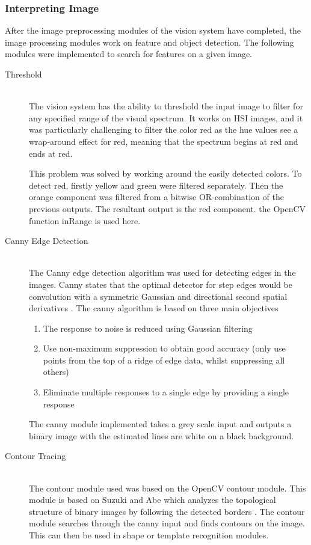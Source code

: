 \subsubsection{Interpreting Image} 
After the image preprocessing modules of the vision system have completed, the image processing modules work on feature and object detection. The following modules were implemented to search for features on a given image. 
\begin{description}
\item[Threshold]\hfill \\
The vision system has the ability to threshold the input image to filter for any specified range of the visual spectrum. 
It works on HSI images, and it was particularly challenging to filter the color red as the hue values see a wrap-around effect for red, meaning that the spectrum begins at red and ends at red.

This problem was solved by working around the easily detected colors. To detect red, firstly yellow and green were filtered separately. Then the orange component was filtered from a bitwise OR-combination of the previous outputs. The resultant output is the red component.
the OpenCV function inRange is used here.

\item[Canny Edge Detection]\hfill \\
The Canny edge detection algorithm \cite{Canny:1986:CAE:11274.11275}  was used for detecting edges in the images. Canny states that the optimal detector for step edges would be convolution with a symmetric Gaussian and directional second spatial derivatives \cite{books/sp/Cipolla96}. The canny algorithm is based on three main objectives \cite{Nixon:2008:FEI:1571711}
\begin{enumerate}
  \item The response to noise is reduced using Gaussian filtering
  \item Use non-maximum suppression to obtain good accuracy (only use points from the top of a ridge of edge data, whilst suppressing all others)
  \item Eliminate multiple responses to a single edge by providing a single response
\end{enumerate}

The canny module implemented takes a grey scale input and outputs a binary image with the estimated lines are white on a black background.

\item[Contour Tracing]\hfill \\
The contour module used was based on the OpenCV contour module. This module is based on Suzuki and Abe which analyzes the topological structure of binary
images by following the detected borders \cite{article:suzuki}. 
The contour module searches through the canny input and finds contours on the image. This can then be used in shape or template recognition modules.


\end{description}
